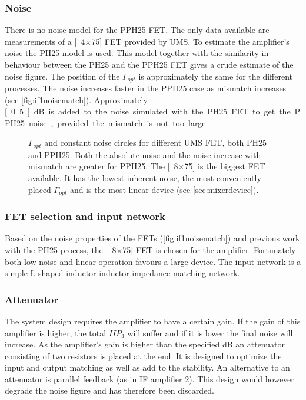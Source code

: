 			\subsubsection{Noise}\label{sec:if1noise}
				There is no noise model for the PPH25 FET. The only data available are measurements of a \unit[4$\times$75]{\mum} FET provided by UMS. To estimate the amplifier's noise the PH25 model is used. This model together with the similarity in behaviour between the PH25 and the PPH25 FET gives a crude estimate of the noise figure. The position of the $\Gamma_{opt}$ is approximately the same for the different processes. The noise increases faster in the PPH25 case as mismatch increases (see \autoref{fig:if1noisematch}). Approximately \unit[0.5]{dB} is added to the noise simulated with the PH25 FET to get the PPH25 noise, provided the mismatch is not too large.

			\begin{figure}[hbt!]
				\centering
				\caption[$\Gamma_{opt}$ and constant noise circles for UMS FETs.]{$\Gamma_{opt}$ and constant noise circles for different UMS FET, both PH25 and PPH25. Both the absolute noise and the noise increase with mismatch are greater for PPH25. The \unit[8$\times$75]{\mum} is the biggest FET available. It has the lowest inherent noise, the most conveniently placed $\Gamma_{opt}$ and is the most linear device (see \autoref{sec:mixerdevice}).}\label{fig:if1noisematch}
			\end{figure}

			\subsubsection{FET selection and input network}
				Based on the noise properties of the FETs (\autoref{fig:if1noisematch}) and previous work with the PH25 process\autocite{gustavsson07}, the \unit[8$\times$75]{\mum} FET is chosen for the amplifier. Fortunately both low noise and linear operation favours a large device. The input network is a simple L-shaped inductor-inductor impedance matching network.

			\subsubsection{Attenuator}
				The system design requires the amplifier to have a certain gain. If the gain of this amplifier is higher, the total $IIP_3$ will suffer and if it is lower the final noise will increase. As the amplifier's gain is higher than the specified \unit[12]{dB} an attenuator consisting of two resistors is placed at the end. It is designed to optimize the input and output matching as well as add to the stability.\autocite{delpy06} An alternative to an attenuator is parallel feedback (as in IF amplifier 2). This design would however degrade the noise figure and has therefore been discarded.

